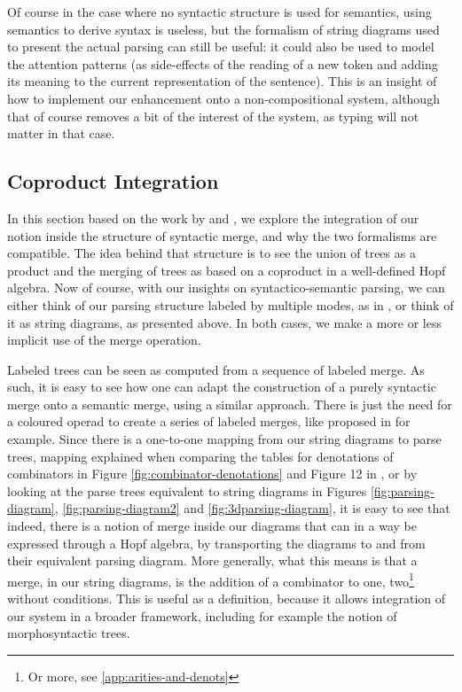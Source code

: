 Of course in the case where no syntactic structure is used for semantics,
using semantics to derive syntax is useless, but the formalism of string
diagrams used to present the actual parsing can still be useful:
it could also be used to model the attention patterns (as side-effects of the
reading of a new token and adding its meaning to the current representation
of the sentence).
This is an insight of how to implement our enhancement onto a non-compositional
system, although that of course removes a bit of the interest of the system, as
typing will not matter in that case.

\subsection{Coproduct Integration}
In this section based on the work by
and ,
we explore the integration of our notion inside the structure of syntactic
merge, and why the two formalisms are compatible.
The idea behind that structure is to see the union of trees as a product and
the merging of trees as based on a coproduct in a well-defined Hopf algebra.
Now of course, with our insights on syntactico-semantic parsing, we can either
think of our parsing structure labeled by multiple modes, as in
\cite{bumfordEffectdrivenInterpretationFunctors2025}, or think of it as string
diagrams, as presented above.
In both cases, we make a more or less implicit use of the merge operation.

\medskip

Labeled trees can be seen as computed from a sequence of labeled merge.
As such, it is easy to see how one can adapt the construction of a purely
syntactic merge onto a semantic merge, using a similar approach.
There is just the need for a coloured operad to create a series of labeled
merges, like proposed in
\cite{melliesCategoricalContoursChomskySchutzenberger2025} for example.
Since there is a one-to-one mapping from our string diagrams to parse trees,
mapping explained when comparing the tables for denotations of combinators
in Figure \ref{fig:combinator-denotations} and Figure 12 in
\cite{bumfordEffectdrivenInterpretationFunctors2025}, or by looking at the
parse trees equivalent to string diagrams in Figures \ref{fig:parsing-diagram},
\ref{fig:parsing-diagram2} and \ref{fig:3dparsing-diagram}, it is easy to see
that indeed, there is a notion of merge inside our diagrams that can in a way
be expressed through a Hopf algebra, by transporting the diagrams to and from
their equivalent parsing diagram.
More generally, what this means is that a merge, in our string diagrams, is
the addition of a combinator to one, two\footnote{Or more, see
	\ref{app:arities-and-denots}} without conditions.
This is useful as a definition, because it allows integration of our system in
a broader framework, including for example the notion of morphosyntactic trees.

